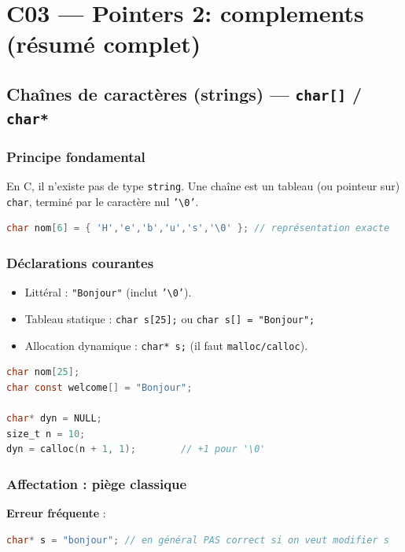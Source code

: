 
\section{C03 — Pointers 2: complements (résumé complet)}

\subsection{Chaînes de caractères (strings) — \texttt{char[]} / \texttt{char*}}
\subsubsection{Principe fondamental}
En C, il n'existe pas de type \texttt{string}. Une chaîne est un tableau (ou pointeur sur)
\texttt{char}, terminé par le caractère nul \texttt{'\textbackslash 0'}.

\begin{lstlisting}[language=C]
char nom[6] = { 'H','e','b','u','s','\0' }; // représentation exacte
\end{lstlisting}

\subsubsection{Déclarations courantes}
\begin{itemize}
  \item Littéral : \texttt{"Bonjour"} (inclut \texttt{'\textbackslash 0'}).
  \item Tableau statique : \texttt{char s[25];} ou \texttt{char s[] = "Bonjour";}
  \item Allocation dynamique : \texttt{char* s;} (il faut \texttt{malloc/calloc}).
\end{itemize}

\begin{lstlisting}[language=C]
char nom[25];
char const welcome[] = "Bonjour";

char* dyn = NULL;
size_t n = 10;
dyn = calloc(n + 1, 1);        // +1 pour '\0'
\end{lstlisting}

\subsubsection{Affectation : piège classique}
\textbf{Erreur fréquente} :
\begin{lstlisting}[language=C]
char* s = "bonjour"; // en général PAS correct si on veut modifier s
\end{lstlisting}

